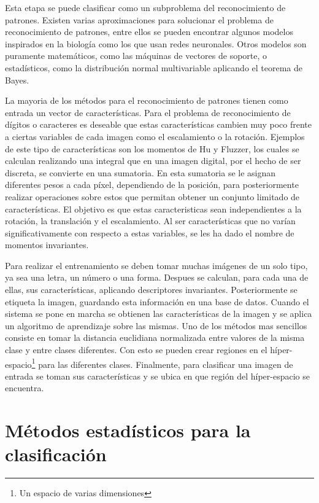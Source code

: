 \documentclass[a4paper, 11pt, oneside]{report}
\begin{document}
Esta etapa se puede clasificar como un subproblema del reconocimiento de patrones. Existen varias aproximaciones para solucionar el problema de reconocimiento de patrones, entre ellos se pueden encontrar algunos modelos inspirados en la biología como los que usan redes neuronales. Otros modelos son puramente matemáticos, como las máquinas de vectores de soporte, o estadísticos, como la distribución normal multivariable aplicando el teorema de Bayes.

La  mayoria de los métodos para el reconocimiento de patrones tienen como entrada un vector de características. Para el problema de reconocimiento de dígitos o caracteres es deseable que estas características cambien muy poco frente a ciertas variables de cada imagen como el escalamiento o la rotación. Ejemplos de este tipo de características son los momentos de Hu y Fluzzer, los cuales se calculan realizando una integral que en una imagen digital, por el hecho de ser discreta, se convierte en una sumatoria. En esta sumatoria se le asignan diferentes pesos a cada píxel, dependiendo de la posición, para posteriormente realizar operaciones sobre estos que permitan obtener un conjunto limitado de características. El objetivo es que estas caracteristicas sean independientes a la rotación, la translación y el escalamiento. Al ser características que no varían significativamente con respecto a estas variables, se les ha dado el nombre de momentos invariantes.

Para realizar el entrenamiento se deben tomar muchas imágenes de un solo tipo, ya sea una letra, un número o una forma. Despues se calculan, para cada una de ellas, sus características, aplicando descriptores invariantes. Posteriormente se etiqueta la imagen, guardando esta información en una base de datos. Cuando el sistema se pone en marcha se obtienen las características de la imagen y se aplica un algoritmo de aprendizaje sobre las mismas. Uno de los métodos mas sencillos consiste en tomar la distancia euclidiana normalizada entre valores de la misma clase y entre clases diferentes. Con esto se pueden crear regiones en el híper-espacio\footnote{Un espacio de varias dimensiones} para las diferentes clases. Finalmente, para clasificar una imagen de entrada se toman sus características y se ubica en que región del híper-espacio se encuentra.
    
\chapter{Métodos estadísticos para la clasificación}
\label{chap:ml}
\end{document}
